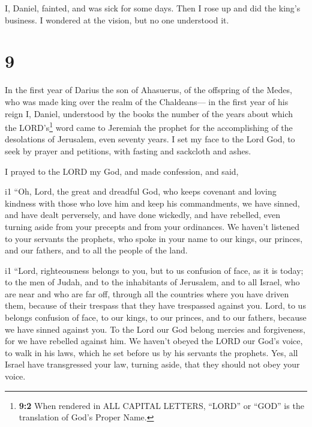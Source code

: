  I, Daniel, fainted, and was sick for some days. Then I
rose up and did the king's business. I wondered at the vision, but no
one understood it.

\hypertarget{section-8}{%
\section{9}\label{section-8}}

 In the first year of Darius the son of Ahasuerus, of the
offspring of the Medes, who was made king over the realm of the
Chaldeans---  in the first year of his reign I, Daniel,
understood by the books the number of the years about which the
LORD's\footnote{\textbf{9:2} When rendered in ALL CAPITAL LETTERS,
  ``LORD'' or ``GOD'' is the translation of God's Proper Name.} word
came to Jeremiah the prophet for the accomplishing of the desolations of
Jerusalem, even seventy years.  I set my face to the Lord
God, to seek by prayer and petitions, with fasting and sackcloth and
ashes.

 I prayed to the LORD my God, and made confession, and
said,

i1 ``Oh, Lord, the great and dreadful God, who keeps covenant and loving
kindness with those who love him and keep his commandments,
 we have sinned, and have dealt perversely, and have done
wickedly, and have rebelled, even turning aside from your precepts and
from your ordinances.  We haven't listened to your
servants the prophets, who spoke in your name to our kings, our princes,
and our fathers, and to all the people of the land.

i1 ``Lord, righteousness belongs to you, but to us
confusion of face, as it is today; to the men of Judah, and to the
inhabitants of Jerusalem, and to all Israel, who are near and who are
far off, through all the countries where you have driven them, because
of their trespass that they have trespassed against you. 
Lord, to us belongs confusion of face, to our kings, to our princes, and
to our fathers, because we have sinned against you.  To
the Lord our God belong mercies and forgiveness, for we have rebelled
against him.  We haven't obeyed the LORD our God's voice,
to walk in his laws, which he set before us by his servants the
prophets.  Yes, all Israel have transgressed your law,
turning aside, that they should not obey your voice.

